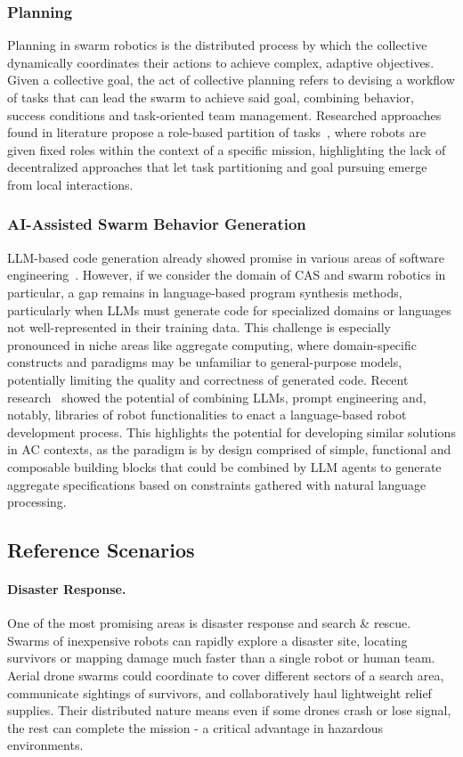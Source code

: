 \documentclass[12pt]{article}
\begin{document}
\subsubsection{Planning}
Planning in swarm robotics is the distributed process by which the collective dynamically coordinates their actions to achieve complex, adaptive objectives.
Given a collective goal, the act of collective planning refers to devising a workflow of tasks that can lead the swarm to achieve said goal, combining behavior, success conditions and task-oriented team management.
Researched approaches found in literature propose a role-based partition of tasks~\cite{sampedro2016flexible}, where robots are given fixed roles within the context of a specific mission, highlighting the lack
of decentralized approaches that let task partitioning and goal pursuing emerge from local interactions.

\subsubsection{AI-Assisted Swarm Behavior Generation}
LLM-based code generation already showed promise in various areas of software engineering~\cite{hudson2024software,zhou2025large,he2025llm}. However, if we consider the domain of CAS and swarm robotics in particular, 
a gap remains in language-based program synthesis methods, particularly when LLMs must generate code for specialized domains or languages not well-represented in their training data. This challenge is especially pronounced in niche areas like aggregate computing, where domain-specific constructs and paradigms may be unfamiliar to general-purpose models, potentially limiting the quality and correctness of generated code.
Recent research~\cite{vemprala2024chatgpt} showed the potential of combining LLMs, prompt engineering and, notably, libraries of robot functionalities 
to enact a language-based robot development process. This highlights the potential for developing similar solutions in AC contexts, as the paradigm is by design comprised of simple, functional and composable building blocks that could
be combined by LLM agents to generate aggregate specifications based on constraints gathered with natural language processing.

\subsection{Reference Scenarios}
\label{sec:scenarios}

\paragraph{Disaster Response.} One of the most promising areas is disaster response and search \& rescue. Swarms of inexpensive robots can rapidly explore a disaster site, 
locating survivors or mapping damage much faster than a single robot or human team. 
Aerial drone swarms could coordinate to cover different sectors of a search area, communicate sightings of survivors, and collaboratively haul lightweight relief supplies. 
Their distributed nature means even if some drones crash or lose signal, the rest can complete the mission - a critical advantage in hazardous environments.
\end{document}
